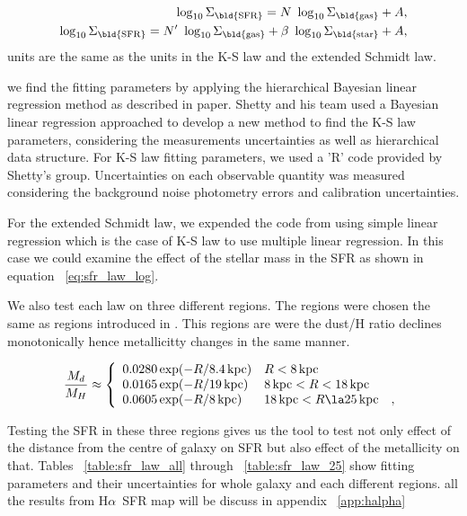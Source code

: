 \documentclass[useAMS,usenatbib]{mn2e}
\newcommand \kpc        {\,{\rm kpc}}
\newcommand \eqsigmagas    {\Sigma_{\rm \bld {gas }}}
\newcommand \eqsigmasfr     {\Sigma_{\rm \bld {SFR }}}
\newcommand \eqsigmastar    {\Sigma_{\rm \bld {star }}}
\newcommand \halpha    {H$\alpha $\ }
\newcommand \eqnprime {N^\prime}
\begin{document}
\begin{subequations}
\begin{align}
\label{eq:sfr_law_log}
\log_{10} \eqsigmasfr = N~\log_{10} \eqsigmagas + A, \\
\log_{10} \eqsigmasfr = \eqnprime~\log_{10} \eqsigmagas + \beta~\log_{10}\eqsigmastar  + A,\\
\end{align}
\end{subequations}
units are the same as the units in the K-S law and the extended Schmidt law.

we find the fitting parameters by applying the hierarchical Bayesian linear regression method as described in \cite{Shetty13} paper. Shetty and his team used a Bayesian linear regression approached to develop a new method to find the K-S law parameters, considering the measurements uncertainties as well as hierarchical data structure. For K-S law fitting parameters, we used a 'R' code provided by Shetty's group. Uncertainties on each observable quantity was measured considering the background noise photometry errors and calibration uncertainties.%

For the extended Schmidt law, we expended the code from using simple linear regression which is the case of K-S law to use multiple linear regression. In this case we could examine the effect of the stellar mass in the SFR as shown in equation ~\ref{eq:sfr_law_log}.

We also test each law on three different regions. The regions were chosen the same as regions introduced in \cite{Drain14}. This regions are were the dust/H ratio declines monotonically hence metallicitty changes in the same manner.  %

\begin{equation}
\label{eq:dust2gas_vs_R}
\frac{M_d}{M_H} \approx
\left\{ \begin{array}{l l}
0.0280 \exp(-R/8.4\kpc)  & R< 8\kpc\\
0.0165 \exp(-R/19\kpc)   & 8\kpc < R < 18\kpc\\
0.0605 \exp(-R/8\kpc)    & 18\kpc < R \la 25\kpc ~~~,\\
\end{array}
\right.
\end{equation}

Testing the SFR in these three regions gives us the tool to test not only effect of the distance from the centre of galaxy on SFR but also effect of the metallicity on that. Tables ~\ref{table:sfr_law_all} through ~\ref{table:sfr_law_25} show fitting parameters and their uncertainties for whole galaxy and each different regions. all the results from \halpha SFR map will be discuss in appendix ~\ref{app:halpha} %
\end{document}
